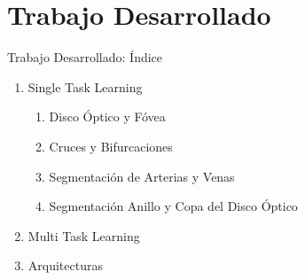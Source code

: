 \documentclass[xcolor=dvipsnames,table]{beamer}
\begin{document}
\section{Trabajo Desarrollado}

\begin{frame}{Trabajo Desarrollado: Índice}
	\begin{block}{}
	\begin{enumerate}
		\item Single Task Learning
				\begin{enumerate}
					\item Disco Óptico y Fóvea
					\item Cruces y Bifurcaciones
					\item Segmentación de Arterias y Venas
					\item Segmentación Anillo y Copa del Disco Óptico
				\end{enumerate}
		\item Multi Task Learning
		\item Arquitecturas
	\end{enumerate}
	\end{block}
\end{frame}
\end{document}
